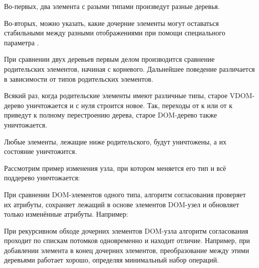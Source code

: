 Во-первых, два элемента с разыми типами произведут разные деревья.

Во-вторых, можно указать, какие дочерние элементы могут оставаться стабильными между разными отображениями при помощи специального параметра .

При сравнении двух деревьев первым делом производится сравнение родительских элементов, начиная с корневого.
Дальнейшее поведение различается в зависимости от типов родительских элементов.

Всякий раз, когда родительские элементы имеют различные типы, старое VDOM-дерево уничтожается и с нуля строится новое.
Так, переходы от  к  или от  к  приведут к полному перестроению дерева, старое DOM-дерево также уничтожается.

Любые элементы, лежащие ниже родительского, будут уничтожены, а их состояние уничтожится.

Рассмотрим пример изменения узла, при котором меняется его тип и всё поддерево уничтожается:

\clearpage
{}

При сравнении DOM-элементов одного типа, алгоритм согласования проверяет их атрибуты, сохраняет лежащий в основе элементов DOM-узел и обновляет только изменённые атрибуты. Например:


При рекурсивном обходе дочерних элементов DOM-узла алгоритм согласования проходит по спискам потомков одновременно и находит отличие.
Например, при добавлении элемента в конец дочерних элементов, преобразование между этими деревьями работает хорошо, определяя минимальный набор операций.

